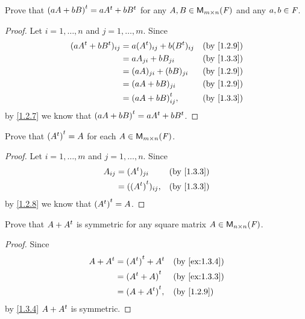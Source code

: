 \exercisesection

\setcounter{ex}{2}
\begin{ex}\label{ex:1.3.3}
	Prove that \({(aA + bB)}^{t} = a{A}^{t} + b{B}^{t}\) for any \(A, B \in \mathsf{M}_{{m} \times n}({\mathit{F}})\) and any \(a, b \in \mathit{F}\).
\end{ex}

\begin{proof}
	Let \(i = 1, \dots, n\) and \(j = 1, \dots, m\).
	Since
	\begin{align*}
		(a\tp{A} + b\tp{B})_{i j} & = a(\tp{A})_{i j} + b(\tp{B})_{i j} &  & \text{(by \cref{1.2.9})} \\
		                          & = aA_{j i} + bB_{j i}               &  & \text{(by \cref{1.3.3})} \\
		                          & = (aA)_{j i} + (bB)_{j i}           &  & \text{(by \cref{1.2.9})} \\
		                          & = (aA + bB)_{j i}                   &  & \text{(by \cref{1.2.9})} \\
		                          & = \tp{(aA + bB)}_{i j},             &  & \text{(by \cref{1.3.3})}
	\end{align*}
	by \cref{1.2.7} we know that \({(aA + bB)}^{t} = a{A}^{t} + b{B}^{t}\).
\end{proof}

\begin{ex}\label{ex:1.3.4}
	Prove that \({({A}^{t})}^{t} = A\) for each \(A \in \mathsf{M}_{{m} \times n}({\mathit{F}})\).
\end{ex}

\begin{proof}
	Let \(i = 1, \dots, m\) and \(j = 1, \dots, n\).
	Since
	\begin{align*}
		A_{i j} & = (\tp{A})_{j i}         &  & \text{(by \cref{1.3.3})} \\
		        & = (\tp{(\tp{A})})_{i j}, &  & \text{(by \cref{1.3.3})}
	\end{align*}
	by \cref{1.2.8} we know that \({({A}^{t})}^{t} = A\).
\end{proof}

\begin{ex}\label{ex:1.3.5}
	Prove that \(A + {A}^{t}\) is symmetric for any square matrix \(A \in \mathsf{M}_{{n} \times n}({\mathit{F}})\).
\end{ex}

\begin{proof}
	Since
	\begin{align*}
		A + \tp{A} & = \tp{(\tp{A})} + \tp{A} &  & \text{(by \cref{ex:1.3.4})} \\
		           & = \tp{(\tp{A} + A)}      &  & \text{(by \cref{ex:1.3.3})} \\
		           & = \tp{(A + \tp{A})},     &  & \text{(by \cref{1.2.9})}
	\end{align*}
	by \cref{1.3.4} \(A + {A}^{t}\) is symmetric.
\end{proof}

